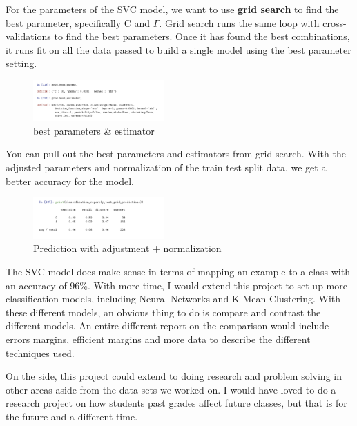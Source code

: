 \documentclass[conference]{IEEEtran}
\begin{document}
For the parameters of the SVC model, we want to use \textbf{grid search} to find the best parameter, specifically C and $\Gamma$. Grid search runs the same loop with cross-validations to find the best parameters. Once it has found the best combinations, it runs fit on all the data passed to build a single model using the best parameter setting.

\begin{figure}[htbp]
\centerline{\includegraphics[width=50mm,scale=0.5]{imgs/params}}
\caption{best parameters \& estimator}
\label{fig}
\end{figure}

You can pull out the best parameters and estimators from grid search. With the adjusted parameters and normalization of the train test split data, we get a better accuracy for the model.

\begin{figure}[htbp]
\centerline{\includegraphics[width=50mm,scale=0.5]{imgs/class2}}
\caption{Prediction with  adjustment + normalization}
\label{fig}
\end{figure}

The SVC model does make sense in terms of mapping an example to a class with an accuracy of 96\%. With more time, I would extend this project to set up more classification models, including Neural Networks and K-Mean Clustering. With these different models, an obvious thing to do is compare and contrast the different models. An entire different report on the comparison would include errors margins, efficient margins and more data to describe the different techniques used. 

On the side, this project could extend to doing research and problem solving in other areas aside from the data sets we worked on. I would have loved to do a research project on how students past grades affect future classes, but that is for the future and a different time.

\end{document}
